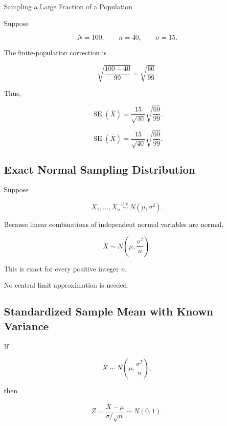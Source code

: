 \begin{workedexamplebox}{Sampling a Large Fraction of a Population}

Suppose

\[
N=100,
\qquad
n=40,
\qquad
\sigma=15.
\]

The finite-population correction is

\[
\sqrt{
\frac{100-40}{99}
}
=
\sqrt{
\frac{60}{99}
}.
\]

Thus,

\[
\operatorname{SE}(\overline{X})
=
\frac{15}{\sqrt{40}}
\sqrt{
\frac{60}{99}
}.
\]

\begin{answerbox}
\[
\boxed{
\operatorname{SE}(\overline{X})
=
\frac{15}{\sqrt{40}}
\sqrt{
\frac{60}{99}
}.
}
\]
\end{answerbox}

\end{workedexamplebox}

\subsection{Exact Normal Sampling Distribution}
\label{subsec:exact-normal-sampling-distribution}

Suppose

\[
X_1,\ldots,X_n
\overset{\text{i.i.d.}}{\sim}
N(\mu,\sigma^2).
\]

Because linear combinations of independent normal variables are normal,

\[
\boxed{
\overline{X}
\sim
N
\left(
\mu,
\frac{\sigma^2}{n}
\right).
}
\]

This is exact for every positive integer \(n\).

No central limit approximation is needed.

\subsection{Standardized Sample Mean with Known Variance}
\label{subsec:z-sample-mean-known-variance}

If

\[
\overline{X}
\sim
N
\left(
\mu,
\frac{\sigma^2}{n}
\right),
\]

then

\[
\boxed{
Z
=
\frac{
\overline{X}-\mu
}{
\sigma/\sqrt{n}
}
\sim
N(0,1).
}
\]

